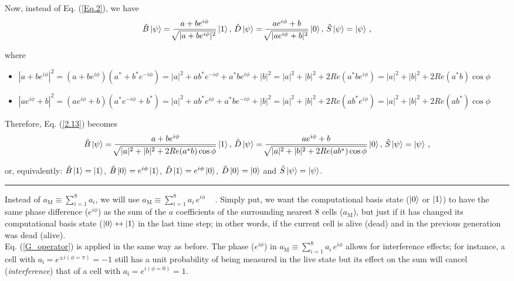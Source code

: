 \documentclass[11pt]{article}
\numberwithin{equation}{section} %
\numberwithin{figure}{section} %
\begin{document}
Now, instead of Eq. (\ref{Eq.2}), we have $\,\,\,$ \cite[p.~3]{Flitney}
\begin{equation} \label{2.13} 
\hat{B}\ket{\psi}=\frac{a+be^{i\phi}}{\sqrt[]{|a+be^{i\phi}|^2}}\ket{1},\, \hat{D}\ket{\psi}=\frac{ae^{i\phi}+b}{\sqrt[]{|ae^{i\phi}+b|^2}}\ket{0},\, \hat{S}\ket{\psi}=\ket{\psi}\,\textrm{,}  
\end{equation}

where
\begin{itemize}
\item $|a+be^{i\phi}|^2=(a+be^{i\phi})(a^*+b^*e^{-i\phi})=|a|^2+ab^*e^{-i\phi}+a^*be^{i\phi}+|b|^2=|a|^2+|b|^2+2Re(a^*be^{i\phi})=|a|^2+|b|^2+2Re(a^*b)\cos\phi$
\item $|ae^{i\phi}+b|^2=(ae^{i\phi}+b)(a^*e^{-i\phi}+b^*)=|a|^2+ab^*e^{i\phi}+a^*be^{-i\phi}+|b|^2=|a|^2+|b|^2+2Re(ab^*e^{i\phi})=|a|^2+|b|^2+2Re(ab^*)\cos\phi$
\end{itemize}

Therefore, Eq. (\ref{2.13}) becomes
\begin{equation} 
\hat{B}\ket{\psi}=\frac{a+be^{i\phi}}{\sqrt[]{|a|^2+|b|^2+2Re(a^*b)\cos\phi}}\ket{1},\, \hat{D}\ket{\psi}=\frac{ae^{i\phi}+b}{\sqrt[]{|a|^2+|b|^2+2Re(ab^*)\cos\phi}}\ket{0},\, \hat{S}\ket{\psi}=\ket{\psi}  \,\textrm{,}
\end{equation}


or, equivalently: $\hat{B}\ket{1}=\ket{1}$, $\hat{B}\ket{0}=e^{i\phi}\ket{1}$,  $\hat{D}\ket{1}=e^{i\phi}\ket{0}$, $\hat{D}\ket{0}=\ket{0}$ and $\hat{S}\ket{\psi}=\ket{\psi}$.\\

\noindent
{\color{red} \rule{\linewidth}{0.5mm} }

Instead of $a_{\textrm{M}}\equiv\sum_{i=1}^8 a_i$, we will use $a_{\textrm{M}}\equiv\sum_{i=1}^8 a_i\,e^{i\phi}$ $\,\,\,$ \cite[p.~3, Eq.~(12)]{Flitney}. Simply put, we want the computational basis state ($\ket{0}$ or $\ket{1}$) to have the same phase difference ($e^{i\phi}$) as the sum of the $a$ coefficients of the surrounding nearest 8 cells ($a_{\textrm{M}}$), but just if it has changed its computational basis state ($\ket{0}\leftrightarrow\ket{1}$ in the last time step; in other words, if the current cell is alive (dead) and in the previous generation was dead (alive).\\

Eq. (\ref{G_operator}) is applied in the same way as before. The phase ($e^{i\phi}$) in $a_{\textrm{M}}\equiv\sum_{i=1}^8 a_i\,e^{i\phi}$ allows for interference effects; for instance, a cell with $a_{\textrm{i}}=e^{\pm i(\phi=\pi)}=-1$ still has a unit probability of being measured in the live state but its effect on the sum will cancel (\emph{interference}) that of a cell with $a_{\textrm{i}}=e^{i(\phi=0)}=1$.
\end{document}
